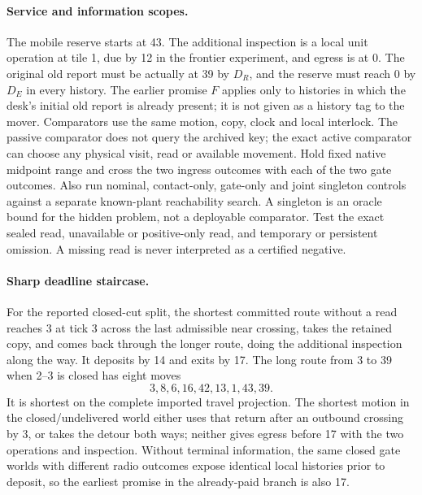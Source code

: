 \documentclass{article}
\begin{document}
\paragraph{Service and information scopes.}
The mobile reserve starts at 43. The additional inspection is a
local unit operation at tile 1, due by 12 in the frontier experiment,
and egress is at 0. The original old report must be actually at 39 by
$D_R$, and the reserve must reach 0 by $D_E$ in every history. The
earlier promise $F$ applies only to histories in which the desk's
initial old report is already present; it is not given as a history
tag to the mover. Comparators use the same motion, copy, clock and
local interlock. The passive comparator does not query the archived
key; the exact active comparator can choose any physical visit,
read or available movement. Hold fixed native midpoint range and
cross the two ingress outcomes with each of the two gate outcomes.
Also run nominal, contact-only, gate-only and joint singleton controls
against a separate known-plant reachability search. A singleton is
an oracle bound for the hidden problem, not a deployable comparator.
Test the exact sealed read, unavailable or positive-only read, and
temporary or persistent omission. A missing read is never interpreted
as a certified negative.

\paragraph{Sharp deadline staircase.}
For the reported closed-cut split, the shortest committed route
without a read reaches 3 at tick 3 across the last admissible near
crossing, takes the retained copy, and comes back through the longer
route, doing the additional inspection along the way. It deposits
by 14 and exits by 17. The long route from 3 to 39 when 2--3 is
closed has eight moves
\[
       3,8,6,16,42,13,1,43,39 .
\]
It is shortest on the complete imported travel projection. The
shortest motion in the closed/undelivered world either uses that
return after an outbound crossing by 3, or takes the detour both
ways; neither gives egress before 17 with the two operations and
inspection. Without terminal information, the same closed gate
worlds with different radio outcomes expose identical local histories
prior to deposit, so the earliest promise in the already-paid
branch is also 17.
\end{document}
